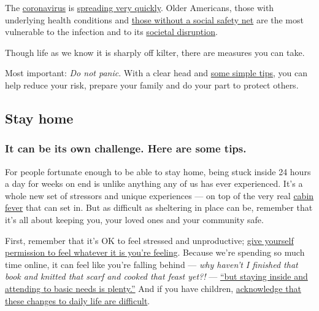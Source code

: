The
\href{https://www.nytimes.com/2020/04/03/technology/coronavirus-masks-shortage.html}{coronavirus}
is
\href{https://www.nytimes.com/interactive/2020/world/asia/china-coronavirus-contain.html}{spreading
very quickly}. Older Americans, those with underlying health conditions
and
\href{https://www.nytimes.com/2020/03/10/us/coronavirus-homeless.html?smtyp=cur\&smid=tw-nytimes}{those
without a social safety net} are the most vulnerable to the infection
and to its
\href{https://www.nytimes.com/live/2020/coronavirus-usa-03-16}{societal
disruption}.

Though life as we know it is sharply off kilter, there are measures you
can take.

Most important: \emph{Do not panic}. With a clear head and
\href{https://www.nytimes.com/2020/03/10/us/politics/coronavirus-guidelines.html}{some
simple tips}, you can help reduce your risk, prepare your family and do
your part to protect others.

\hypertarget{stay-home}{%
\subsection{Stay home}\label{stay-home}}

\hypertarget{it-can-be-its-own-challenge-here-are-some-tips}{%
\subsubsection{It can be its own challenge. Here are some
tips.}\label{it-can-be-its-own-challenge-here-are-some-tips}}

For people fortunate enough to be able to stay home, being stuck inside
24 hours a day for weeks on end is unlike anything any of us has ever
experienced. It's a whole new set of stressors and unique experiences
--- on top of the very real
\href{https://www.nytimes.com/2020/03/25/business/coronavirus-families-cabin-fever.html}{cabin
fever} that can set in. But as difficult as sheltering in place can be,
remember that it's all about keeping you, your loved ones and your
community safe.

First, remember that it's OK to feel stressed and unproductive;
\href{https://www.nytimes.com/2020/03/23/smarter-living/coronavirus-coping-tips.html}{give
yourself permission to feel whatever it is you're feeling}. Because
we're spending so much time online, it can feel like you're falling
behind --- \emph{why haven't I finished that book and knitted that scarf
and cooked that feast yet?!} ---
\href{https://www.nytimes.com/2020/04/01/style/productivity-coronavirus.html}{``but
staying inside and attending to basic needs is plenty.''} And if you
have children,
\href{https://www.nytimes.com/2020/04/01/parenting/coronavirus-help-anxious-kid.html}{acknowledge
that these changes to daily life are difficult}.

